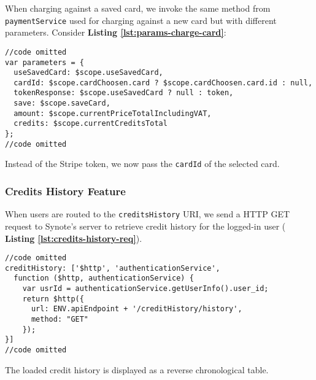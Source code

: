 When charging against a saved card, we invoke the same method from \texttt{paymentService} used for charging against a new card but with different parameters. Consider \textbf{Listing \ref{lst:params-charge-card}}:\\

\begin{listing}[H]
\begin{verbatim}
//code omitted
var parameters = {
  useSavedCard: $scope.useSavedCard,
  cardId: $scope.cardChoosen.card ? $scope.cardChoosen.card.id : null,
  tokenResponse: $scope.useSavedCard ? null : token,
  save: $scope.saveCard,
  amount: $scope.currentPriceTotalIncludingVAT,
  credits: $scope.currentCreditsTotal
};
//code omitted
\end{verbatim}
\label{lst:params-charge-card}
\end{listing}

Instead of the Stripe token, we now pass the \texttt{cardId} of the selected card.

\subsubsection{Credits History Feature}
\label{subsubsec:credits-history-feature}

When users are routed to the \texttt{creditsHistory} URI, we send a HTTP GET request to Synote’s server to retrieve credit history for the logged-in user ( \textbf{Listing \ref{lst:credits-history-req}}).\\

\begin{listing}[H]
\begin{verbatim}
//code omitted
creditHistory: ['$http', 'authenticationService',
  function ($http, authenticationService) {
    var usrId = authenticationService.getUserInfo().user_id;
    return $http({
      url: ENV.apiEndpoint + '/creditHistory/history',
      method: "GET"
    });
}]
//code omitted
\end{verbatim}
\label{lst:credits-history-req}
\end{listing}

The loaded credit history is displayed as a reverse chronological table.

